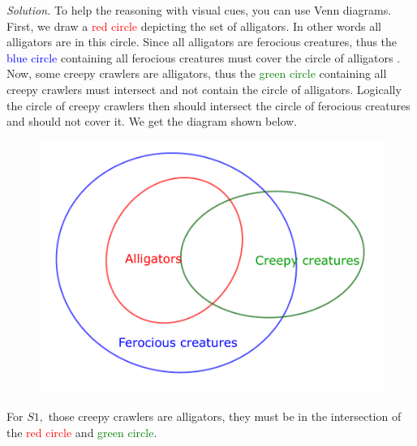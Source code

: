 \begin{multicols}{2}
	\vskip 0.2cm
	\textit{Solution.}
	To help the reasoning with visual cues, you can use Venn diagrams.
	\vskip 0.1cm
	First, we draw a \textcolor{red}{red circle} depicting the set of alligators. In other words all alligators are in this circle.
	Since all alligators are ferocious creatures, thus the \textcolor{blue}{blue circle} containing all ferocious creatures must cover the circle of alligators .
	Now, some creepy crawlers are alligators, thus the \textcolor{green}{green circle} containing all creepy crawlers must intersect and not contain the circle of alligators.
	Logically the circle of creepy crawlers then should intersect the circle of ferocious creatures and should not cover it.
	We get the diagram shown below.
	\begin{figure}[H]
		\vspace*{-5pt}
		\centering
		\captionsetup{labelformat= empty, justification=centering}
		\includegraphics[width= 1\linewidth]{pi-2023-01-03.pdf}
		\vspace*{-10pt}
	\end{figure}
	For $S1,$ those creepy crawlers are alligators, they must be in the intersection of the \textcolor{red}{red circle} and \textcolor{green}{green circle}.

\end{multicols}
